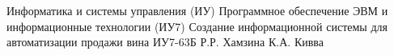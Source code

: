 \documentclass{bmstu}
\begin{document}
\makecourseworktitle
	{Информатика и системы управления (ИУ)}
	{Программное обеспечение ЭВМ и информационные технологии (ИУ7)}
	{Создание информационной системы для автоматизации продажи вина}
	{ИУ7-63Б}
	{Р.Р. Хамзина}
	{К.А. Кивва}{}{}



\maketableofcontents








\makebibliography
\end{document}
